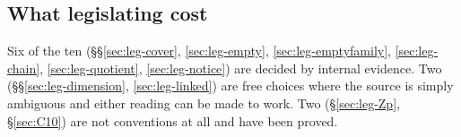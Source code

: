 \subsection{What legislating cost}\label{sec:leg-cost}

Six of the ten (\S\S\ref{sec:leg-cover}, \ref{sec:leg-empty},
\ref{sec:leg-emptyfamily}, \ref{sec:leg-chain}, \ref{sec:leg-quotient},
\ref{sec:leg-notice}) are decided by internal evidence. Two
(\S\S\ref{sec:leg-dimension}, \ref{sec:leg-linked}) are free choices where the
source is simply ambiguous and either reading can be made to work. Two
(\S\ref{sec:leg-Zp}, \S\ref{sec:C10}) are not conventions at all and have been
proved.
